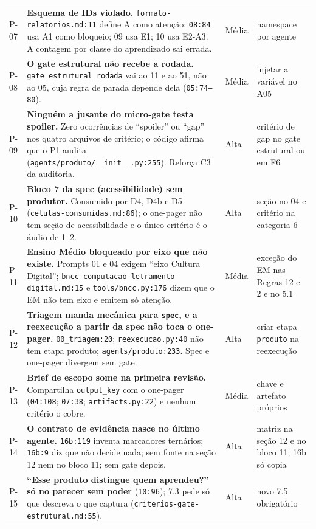 \documentclass[11pt,a4paper]{article}
\begin{document}
\begin{longtable}{@{}p{0.9cm} >{\raggedright\arraybackslash}p{8.6cm} p{1.1cm} >{\raggedright\arraybackslash}p{4.9cm}@{}}
P-07 & \textbf{Esquema de IDs violado.} \texttt{formato-relatorios.md:11} define A como atenção; \texttt{08:84} usa A1 como bloqueio; 09 usa E1; 10 usa E2-A3. A contagem por classe do aprendizado sai errada. & Média & namespace por agente \\
P-08 & \textbf{O gate estrutural não recebe a rodada.} \texttt{gate\_estrutural\_rodada} vai ao 11 e ao 51, não ao 05, cuja regra de parada depende dela (\texttt{05:74--80}). & Média & injetar a variável no A05 \\
P-09 & \textbf{Ninguém a jusante do micro-gate testa spoiler.} Zero ocorrências de ``spoiler'' ou ``gap'' nos quatro arquivos de critério; o código afirma que o P1 audita (\texttt{agents/produto/\_\_init\_\_.py:255}). Reforça C3 da auditoria. & Alta & critério de gap no gate estrutural ou em F6 \\
P-10 & \textbf{Bloco 7 da spec (acessibilidade) sem produtor.} Consumido por D4, D4b e D5 (\texttt{celulas-consumidas.md:86}); o one-pager não tem seção de acessibilidade e o único critério é o áudio de 1\textordmasculine{}--2\textordmasculine{}. & Alta & seção no 04 e critério na categoria 6 \\
P-11 & \textbf{Ensino Médio bloqueado por eixo que não existe.} Prompts 01 e 04 exigem ``eixo Cultura Digital''; \texttt{bncc-computacao-letramento-digital.md:15} e \texttt{tools/bncc.py:176} dizem que o EM não tem eixo e emitem só atenção. & Média & exceção do EM nas Regras 12 e 2 e no 5.1 \\
P-12 & \textbf{Triagem manda mecânica para \texttt{spec}, e a reexecução a partir da spec não toca o one-pager.} \texttt{00\_triagem:20}; \texttt{reexecucao.py:40} não tem etapa produto; \texttt{agents/produto:233}. Spec e one-pager divergem sem gate. & Alta & criar etapa \texttt{produto} na reexecução \\
P-13 & \textbf{Brief de escopo some na primeira revisão.} Compartilha \texttt{output\_key} com o one-pager (\texttt{04:108}; \texttt{07:38}; \texttt{artifacts.py:22}) e nenhum critério o cobre. & Média & chave e artefato próprios \\
P-14 & \textbf{O contrato de evidência nasce no último agente.} \texttt{16b:119} inventa marcadores ternários; \texttt{16b:9} diz que não decide nada; sem fonte na seção 12 nem no bloco 11; sem gate depois. & Alta & matriz na seção 12 e no bloco 11; 16b só copia \\
P-15 & \textbf{``Esse produto distingue quem aprendeu?'' só no parecer sem poder} (\texttt{10:96}); 7.3 pede só que descreva o que captura (\texttt{criterios-gate-estrutural.md:55}). & Alta & novo 7.5 obrigatório \\

\end{longtable}
\end{document}
